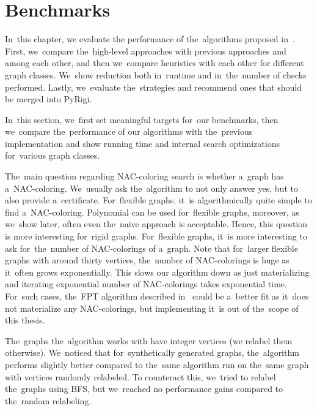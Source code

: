 \chapter{Benchmarks}%
\label{chapter:benchmarks}

\begin{chapterabstract}

	In~this chapter,
	we evaluate the performance of the~algorithms
	proposed in~.
	First, we~compare the~high-level approaches with previous approaches and among each other,
	and then we~compare heuristics with each other
	for different graph classes.
	We~show reduction both in~runtime and in~the~number
	of \IsNACColoring{} checks performed.
	Lastly, we~evaluate the~strategies and
	recommend ones that should be merged into PyRigi.

\end{chapterabstract}

In~this section, we~first set meaningful targets for~our benchmarks,
then we~compare the~performance of our algorithms with the~previous implementation
and show running time and internal search optimizations for~various graph classes.

The~main question regarding NAC-coloring search is whether a~graph has a~NAC-coloring.
We~usually ask the~algorithm to not only answer yes, but to also provide a~certificate.
%
For~flexible graphs, it~is algorithmically quite simple to find a~NAC-coloring.
Polynomial 
can be used for~flexible graphs,
moreover, as we~show later, often even the~naive approach is acceptable.
Hence, this question is more interesting for~rigid graphs.
%
For~flexible graphs, it~is more interesting to ask for~the~number of NAC-colorings
of a~graph.
Note that for~larger flexible graphs with around thirty vertices,
the~number of NAC-colorings is huge as it~often grows exponentially.
This slows our algorithm down as just materializing and iterating exponential
number of NAC-colorings takes exponential time.
%
For~such cases, the~FPT algorithm described in~
could be a~better fit as it~does not materialize any NAC-colorings,
but implementing it~is out of the~scope of this thesis.

The~graphs the~algorithm works with have integer vertices (we relabel them otherwise).
We~noticed that for~synthetically generated graphs,
the~algorithm performs slightly better compared to
the~same algorithm run on the~same graph with vertices randomly relabeled.
To counteract this, we~tried to relabel the~graphs using BFS,
but we~reached no performance gains compared to the~random relabeling.

